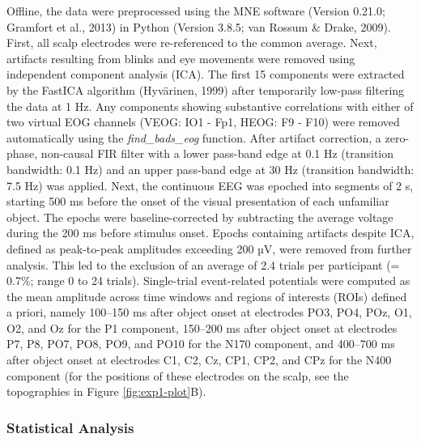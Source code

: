 \documentclass[
  english,
  doc,12pt,twoside,floatsintext]{apa7}
\begin{document}
Offline, the data were preprocessed using the MNE software (Version 0.21.0; Gramfort et al., 2013) in Python (Version 3.8.5; van Rossum \& Drake, 2009). First, all scalp electrodes were re-referenced to the common average. Next, artifacts resulting from blinks and eye movements were removed using independent component analysis (ICA). The first 15 components were extracted by the FastICA algorithm (Hyvärinen, 1999) after temporarily low-pass filtering the data at 1 Hz. Any components showing substantive correlations with either of two virtual EOG channels (VEOG: IO1 - Fp1, HEOG: F9 - F10) were removed automatically using the \emph{find\_bads\_eog} function. After artifact correction, a zero-phase, non-causal FIR filter with a lower pass-band edge at 0.1 Hz (transition bandwidth: 0.1 Hz) and an upper pass-band edge at 30 Hz (transition bandwidth: 7.5 Hz) was applied. Next, the continuous EEG was epoched into segments of 2 s, starting 500 ms before the onset of the visual presentation of each unfamiliar object. The epochs were baseline-corrected by subtracting the average voltage during the 200 ms before stimulus onset. Epochs containing artifacts despite ICA, defined as peak-to-peak amplitudes exceeding 200 µV, were removed from further analysis. This led to the exclusion of an average of 2.4 trials per participant (= 0.7\%; range 0 to 24 trials). Single-trial event-related potentials were computed as the mean amplitude across time windows and regions of interests (ROIs) defined a priori, namely 100--150 ms after object onset at electrodes PO3, PO4, POz, O1, O2, and Oz for the P1 component, 150--200 ms after object onset at electrodes P7, P8, PO7, PO8, PO9, and PO10 for the N170 component, and 400--700 ms after object onset at electrodes C1, C2, Cz, CP1, CP2, and CPz for the N400 component (for the positions of these electrodes on the scalp, see the topographies in Figure \ref{fig:exp1-plot}B).

\hypertarget{statistical-analysis}{%
\subsubsection{Statistical Analysis}\label{statistical-analysis}}
\end{document}
